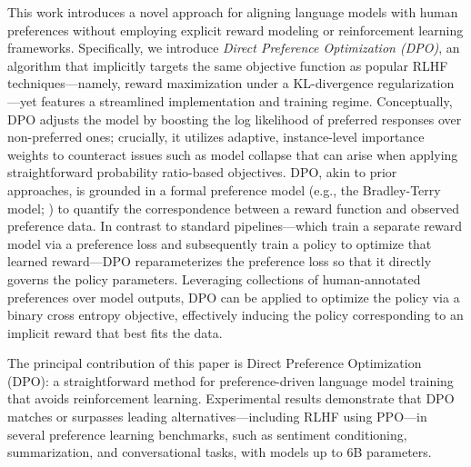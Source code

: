 This work introduces a novel approach for aligning language models with human preferences without employing explicit reward modeling or reinforcement learning frameworks. Specifically, we introduce \textit{{Direct Preference Optimization} (DPO)}, an algorithm that implicitly targets the same objective function as popular RLHF techniques—namely, reward maximization under a KL-divergence regularization—yet features a streamlined implementation and training regime. Conceptually, DPO adjusts the model by boosting the log likelihood of preferred responses over non-preferred ones; crucially, it utilizes adaptive, instance-level importance weights to counteract issues such as model collapse that can arise when applying straightforward probability ratio-based objectives. DPO, akin to prior approaches, is grounded in a formal preference model (e.g., the Bradley-Terry model; \cite{bradley1952rankanalysis}) to quantify the correspondence between a reward function and observed preference data. In contrast to standard pipelines—which train a separate reward model via a preference loss and subsequently train a policy to optimize that learned reward—DPO reparameterizes the preference loss so that it directly governs the policy parameters. Leveraging collections of human-annotated preferences over model outputs, DPO can be applied to optimize the policy via a binary cross entropy objective, effectively inducing the policy corresponding to an implicit reward that best fits the data.

The principal contribution of this paper is Direct Preference Optimization (DPO): a straightforward method for preference-driven language model training that avoids reinforcement learning. Experimental results demonstrate that DPO matches or surpasses leading alternatives—including RLHF using PPO—in several preference learning benchmarks, such as sentiment conditioning, summarization, and conversational tasks, with models up to 6B parameters.

